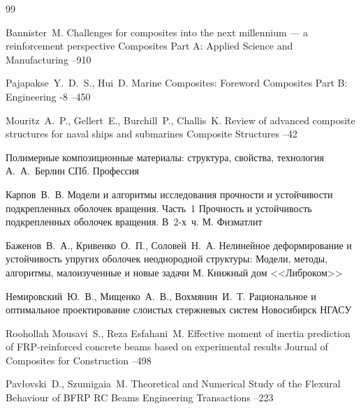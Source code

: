 \begin{thebibliography}{99}


\by Bannister~M.
\paper Challenges for composites into the next millennium — a reinforcement perspective
\jour  Composites Part A: Applied Science and Manufacturing 
--910

\by Pajapakse~Y.~D.~S., Hui~D.
\paper Marine Composites: Foreword
\jour Composites Part B: Engineering
-8 
--450

\by Mouritz~A.~P., Gellert~E., Burchill~P., Challis~K.
\paper Review of advanced composite structures for naval ships and submarines
\jour  Composite Structures
--42

\book Полимерные композиционные материалы: структура, свойства, технология
\ed А.~А.~Берлин
\publaddr СПб.
\publ Профессия

\by Карпов~В.~В.
\book Модели и алгоритмы исследования прочности и устойчивости подкрепленных оболочек вращения. \rm Часть~1
\serial Прочность и устойчивость подкрепленных оболочек вращения. В~2-х~ч. \nofrills
\publaddr М.
\publ Физматлит

\by Баженов~В.~А., Кривенко~О.~П., Соловей~Н.~А.
\book Нелинейное деформирование и устойчивость упругих оболочек неоднородной структуры: Модели, методы, алгоритмы, малоизученные и новые задачи
\publaddr М.
\publ Книжный дом <<Либроком>>

\by Немировский~Ю.~В., Мищенко~А.~В., Вохмянин~И.~Т.
\book Рациональное и оптимальное проектирование слоистых стержневых систем
\publaddr Новосибирск
\publ НГАСУ

\by Roohollah Mousavi~S., Reza Esfahani~M.
\paper Effective moment of inertia prediction of FRP-reinforced concrete beams based on experimental results
\jour Journal of Composites for Construction
--498


\by Pav{\l}ovski~D., Szumigaia~M.
\paper Theoretical and Numerical Study of the Flexural Behaviour of BFRP RC Beams
\jour Engineering Transactions
--223


\end{thebibliography}
